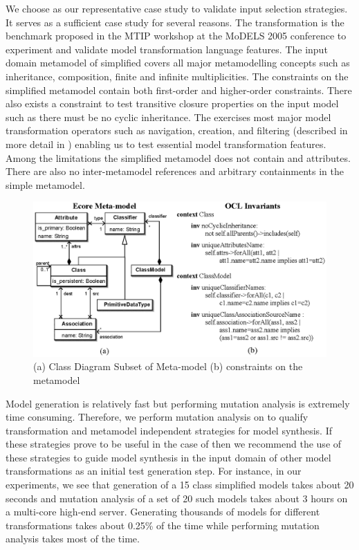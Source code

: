 We choose {\transfo} as our representative case study to validate input selection strategies. It serves as a sufficient case study for several reasons. The transformation is the benchmark proposed in the MTIP workshop at the MoDELS 2005 conference \cite{bezivin2005} to experiment and validate model transformation language features. The input domain metamodel of simplified {\UMLCD}  covers all major metamodelling concepts such as inheritance, composition, finite and infinite multiplicities. The constraints on the simplified {\UMLCD} metamodel contain both first-order and higher-order constraints. There also exists a constraint to test transitive closure properties on the input model such as there must be no cyclic inheritance. The {\transfo} exercises most major model transformation operators such as navigation, creation, and filtering (described in more detail in \cite{mottu2006}) enabling us to test essential model transformation features. Among the limitations the simplified  {\UMLCD} metamodel does not contain {\Integer} and {\Float} attributes. There are also no inter-metamodel references and arbitrary containments in the simple metamodel. 

\begin{figure} [!t]
\begin{center}
\includegraphics[scale=0.75]{./figures/classMMwithInv.eps}
\end{center}
\caption{(a) Class Diagram Subset of {\UML} {\ecore} Meta-model (b) {\OCL} constraints on the {\ecore} metamodel}
\label{fig:umlcd}

\end{figure}

Model generation is relatively fast but performing mutation analysis is extremely time consuming. Therefore, we perform mutation analysis on {\transfo} to qualify transformation and metamodel independent strategies for model synthesis. If these strategies prove to be useful in the case of {\transfo} then we recommend the use of these strategies to guide model synthesis in the input domain of other model transformations as an initial test generation step. For instance, in our experiments, we see that generation of a 15 class simplified {\UMLCD} models takes about 20 seconds and mutation analysis of a set of 20 such models takes about 3 hours on a multi-core high-end server. Generating thousands of models for different transformations takes about 0.25\% of the time while performing mutation analysis takes most of the time. 
